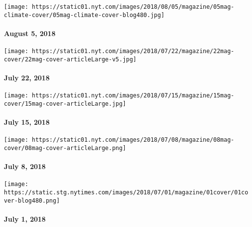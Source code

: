 \href{https://www.nytimes.com/interactive/2018/08/01/magazine/climate-change-losing-earth.html}{}

\texttt{[image: https://static01.nyt.com/images/2018/08/05/magazine/05mag-climate-cover/05mag-climate-cover-blog480.jpg]}

\hypertarget{august-5-2018}{%
\paragraph{August 5, 2018}\label{august-5-2018}}

\href{https://www.nytimes.com/issue/magazine/2018/07/20/the-72218-issue}{}

\texttt{[image: https://static01.nyt.com/images/2018/07/22/magazine/22mag-cover/22mag-cover-articleLarge-v5.jpg]}

\hypertarget{july-22-2018}{%
\paragraph{July 22, 2018}\label{july-22-2018}}

\href{https://www.nytimes.com/issue/magazine/2018/07/17/the-71518-issue}{}

\texttt{[image: https://static01.nyt.com/images/2018/07/15/magazine/15mag-cover/15mag-cover-articleLarge.jpg]}

\hypertarget{july-15-2018}{%
\paragraph{July 15, 2018}\label{july-15-2018}}

\href{https://www.nytimes.com/issue/magazine/2018/07/10/the-7818-issue}{}

\texttt{[image: https://static01.nyt.com/images/2018/07/08/magazine/08mag-cover/08mag-cover-articleLarge.png]}

\hypertarget{july-8-2018}{%
\paragraph{July 8, 2018}\label{july-8-2018}}

\href{https://www.nytimes.com/issue/magazine/2018/06/28/the-7118-issue}{}

\texttt{[image: https://static.stg.nytimes.com/images/2018/07/01/magazine/01cover/01cover-blog480.png]}

\hypertarget{july-1-2018}{%
\paragraph{July 1, 2018}\label{july-1-2018}}

